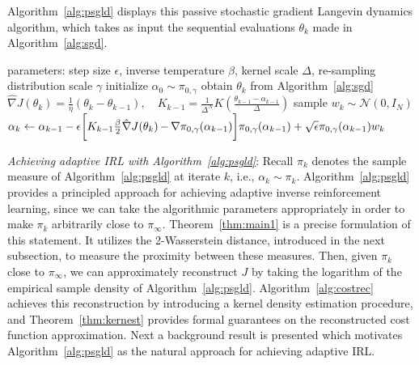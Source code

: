 \documentclass[journal,onecolumn]{IEEEtran}
\newcommand{\alk}{\alpha_k}
\newcommand{\thk}{\theta_k}
\newcommand{\step}{\epsilon}
\newcommand{\delstep}{\frac{1}{\Delta^N}}
\newcommand{\grad}{\nabla}
\newcommand{\gradn}{\hat{\nabla}}
\newcommand{\rew}{J}
\newcommand{\gaus}{\mathcal{N}}
\newcommand{\dimn}{N}
\newcommand{\gibbs}{\ids_{\infty}}
\newcommand{\dtlaw}{\ids_{k}} %
\newcommand{\sgdstep}{\eta}
\newcommand{\ids}{\pi}
\newcommand{\idw}{\gamma}
\newcommand{\isp}{0,\idw}
\newcommand{\ksp}{k,\idw}
\newcommand{\idistrw}{\ids_{\isp}}
\begin{document}
Algorithm~\ref{alg:psgld} displays this passive stochastic gradient Langevin dynamics algorithm, which takes as input the sequential evaluations $\thk$ made in Algorithm~\ref{alg:sgd}.

\begin{algorithm}%
\caption{PSGLD for IRL}\label{alg:psgld}
\begin{algorithmic}[1]
\State parameters: step size $\step$, inverse temperature $\beta$, kernel scale $\Delta$, re-sampling distribution scale $\idw$
\State initialize $\alpha_0 \sim \idistrw$
        \State obtain $\thk$ from Algorithm~\ref{alg:sgd}
        \State $\gradn\rew(\thk) = \frac{1}{\sgdstep}(\thk-\theta_{k-1}),\quad K_{k-1} = \delstep K(\frac{\theta_{k-1} - \alpha_{k-1}}{\Delta})$
        \State sample $w_k \sim \gaus(0,I_{\dimn})$
        \State  $\alk \gets \alpha_{k-1} - \step\biggl[K_{k-1} \frac{\beta}{2} \gradn \rew (\thk) \,\color{black}{-}\, \grad \idistrw(\alpha_{k-1})\biggr]\idistrw(\alpha_{k-1})+ \sqrt{\step}\idistrw(\alpha_{k-1}) w_k$
        \EndIf
\EndWhile
\end{algorithmic}
\end{algorithm}
{\color{black}\textit{Achieving adaptive IRL with Algorithm~\ref{alg:psgld}}: Recall $\dtlaw$ denotes the sample measure of Algorithm~\ref{alg:psgld} at iterate $k$, i.e., $\alk \sim \dtlaw$. Algorithm~\ref{alg:psgld} provides a principled approach for achieving adaptive inverse reinforcement learning, since we can take the algorithmic parameters appropriately in order to make $\dtlaw$ arbitrarily close to $\gibbs$. Theorem~\ref{thm:main1} is a precise formulation of this statement. It utilizes the 2-Wasserstein distance, introduced in the next subsection, to measure the proximity between these measures. Then, given $\dtlaw$ close to $\gibbs$, we can approximately reconstruct $\rew$ by taking the logarithm of the empirical sample density of Algorithm~\ref{alg:psgld}. Algorithm~\ref{alg:costrec} achieves this reconstruction by introducing a kernel density estimation procedure, and Theorem~\ref{thm:kernest} provides formal guarantees on the reconstructed cost function approximation.} Next a background result is presented which motivates Algorithm~\ref{alg:psgld} as the natural approach for achieving adaptive IRL. 
\end{document}
